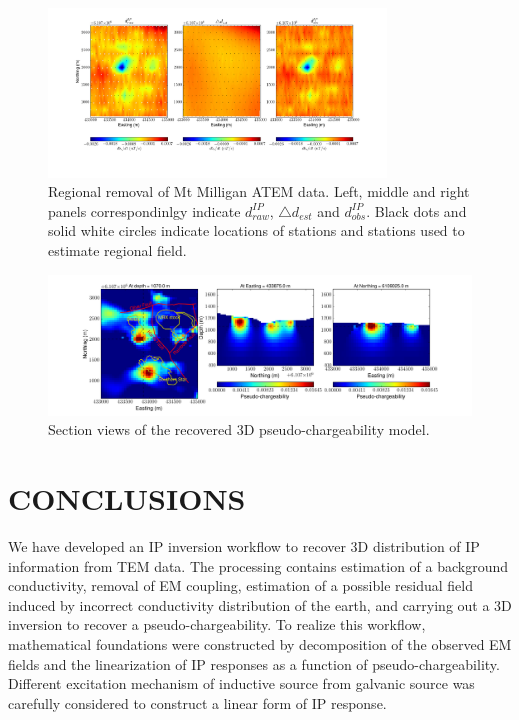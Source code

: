 \documentclass[letterpaper,11pt]{article}
\newcommand{\dip}{d^{IP}}
\begin{document}
\begin{figure}[htb]
  \centering
  \includegraphics[width=0.8\textwidth]{figures/RegRem_field_ch7.png}
  \caption{Regional removal of Mt Milligan ATEM data. Left, middle and right panels correspondinlgy indicate $\dip_{raw}$, $\triangle d_{est}$ and $\dip_{obs}$. Black dots and solid white circles indicate locations of stations and stations used to estimate regional field.}
  \label{Fig:regremoval_field}
\end{figure}

\begin{figure}[htb]
  \centering
  \includegraphics[width=1.0\textwidth]{figures/Peta_field.png}
  \caption{Section views of the recovered 3D pseudo-chargeability model.}
  \label{Fig:Peta_field}
\end{figure}
\clearpage

\section{CONCLUSIONS}
We have developed an IP inversion workflow to recover 3D distribution of IP information from TEM data. The processing contains estimation of a background conductivity, removal of EM coupling, estimation of a possible residual field induced by incorrect conductivity distribution of the earth, and carrying out a 3D inversion to recover a pseudo-chargeability. To realize this workflow, mathematical foundations were constructed by decomposition of the observed EM fields and the linearization of IP responses as a function of pseudo-chargeability. Different excitation mechanism of inductive source from galvanic source was carefully considered to construct a linear form of IP response. 
\end{document}
